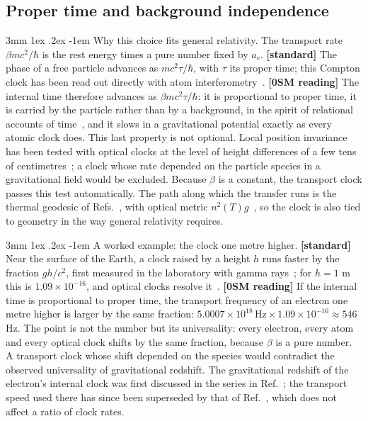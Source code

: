 \documentclass[%
 reprint, amsmath,amssymb, aps, prb, ]{revtex4-2}
\makeatletter
\numberwithin{equation}{section}
\renewcommand\paragraph{%
  \@startsection{paragraph}{4}{\z@}%
    {3mm \@plus 1ex \@minus .2ex}
    {-1em}
    {\normalfont\normalsize\itshape}}
\makeatother
\begin{document}
\subsection{Proper time and background independence}

\paragraph{Why this choice fits general relativity.} The transport rate $\beta mc^2/\hbar$ is the rest energy times a pure number fixed by $a_e$. \textbf{[standard]} The phase of a free particle advances as $mc^2\tau/\hbar$, with $\tau$ its proper time; this Compton clock has been read out directly with atom interferometry~\cite{ref:lan13}. \textbf{[0SM reading]} The internal time therefore advances as $\beta mc^2\tau/\hbar$: it is proportional to proper time, it is carried by the particle rather than by a background, in the spirit of relational accounts of time~\cite{ref:pagewootters,ref:rovelli}, and it slows in a gravitational potential exactly as every atomic clock does. This last property is not optional. Local position invariance~\cite{ref:will14} has been tested with optical clocks at the level of height differences of a few tens of centimetres~\cite{ref:chou10}; a clock whose rate depended on the particle species in a gravitational field would be excluded. Because $\beta$ is a constant, the transport clock passes this test automatically. The path along which the transfer runs is the thermal geodesic of Refs.~\cite{ref:p24,ref:p51}, with optical metric $n^2(T)g$~\cite{ref:gordon23}, so the clock is also tied to geometry in the way general relativity requires.

\paragraph{A worked example: the clock one metre higher.} \textbf{[standard]} Near the surface of the Earth, a clock raised by a height $h$ runs faster by the fraction $gh/c^2$, first measured in the laboratory with gamma rays~\cite{ref:pound}; for $h=1$ m this is $1.09\times10^{-16}$, and optical clocks resolve it~\cite{ref:chou10}. \textbf{[0SM reading]} If the internal time is proportional to proper time, the transport frequency of an electron one metre higher is larger by the same fraction: $5.0007\times10^{18}\,\mathrm{Hz}\times1.09\times10^{-16}\approx546$ Hz. The point is not the number but its universality: every electron, every atom and every optical clock shifts by the same fraction, because $\beta$ is a pure number. A transport clock whose shift depended on the species would contradict the observed universality of gravitational redshift. The gravitational redshift of the electron's internal clock was first discussed in the series in Ref.~\cite{ref:p22}; the transport speed used there has since been superseded by that of Ref.~\cite{ref:p10}, which does not affect a ratio of clock rates.
\end{document}
